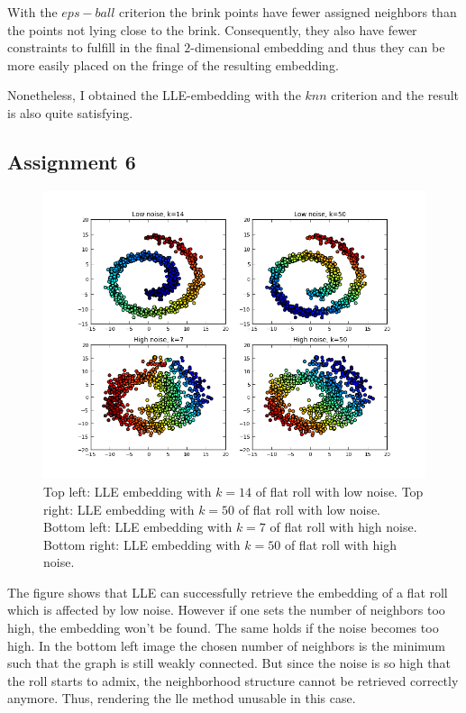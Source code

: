 \documentclass[a4paper, 12pt, titlepage]{article}
\begin{document}
With the $eps-ball$ criterion the brink points have fewer assigned neighbors than the points not lying close to the brink. Consequently, they also have fewer constraints to fulfill in the final $2$-dimensional embedding and thus they can be more easily placed on the fringe of the resulting embedding.

Nonetheless, I obtained the LLE-embedding with the $knn$ criterion and the result is also quite satisfying.
\subsection*{Assignment 6}

\begin{figure}[H]
	\centering
	\includegraphics[width=17cm]{images/noisyFlatroll.png}
	\caption{Top left: LLE embedding with $k=14$ of flat roll with low noise.
	Top right: LLE embedding with $k=50$ of flat roll with low noise.
	Bottom left: LLE embedding with $k=7$ of flat roll with high noise.
	Bottom right: LLE embedding with $k=50$ of flat roll with high noise.}
\end{figure}

The figure shows that LLE can successfully retrieve the embedding of a flat roll which is affected by low noise.
However if one sets the number of neighbors too high, the embedding won't be found.
The same holds if the noise becomes too high.
In the bottom left image the chosen number of neighbors is the minimum such that the graph is still weakly connected.
But since the noise is so high that the roll starts to admix, the neighborhood structure cannot be retrieved correctly anymore.
Thus, rendering the lle method unusable in this case. 
\end{document}
